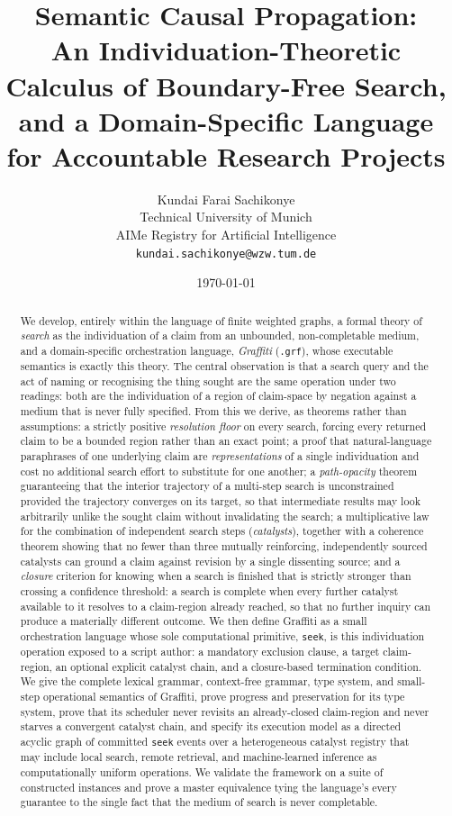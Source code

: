 \documentclass[11pt,twocolumn,a4paper]{article}
\title{\textbf{Semantic Causal Propagation:\\[3pt]
An Individuation-Theoretic Calculus of Boundary-Free Search,\\
and a Domain-Specific Language for Accountable Research Projects}}
\author{%
Kundai Farai Sachikonye\\
\small Technical University of Munich\\
\small AIMe Registry for Artificial Intelligence\\
\small \texttt{kundai.sachikonye@wzw.tum.de}}
\date{\today}
\theoremstyle{thmstyle}
\theoremstyle{definition}
\theoremstyle{remark}
\begin{document}
\maketitle

\begin{abstract}
\noindent
We develop, entirely within the language of finite weighted graphs, a
formal theory of \emph{search} as the individuation of a claim from an
unbounded, non-completable medium, and a domain-specific orchestration
language, \emph{Graffiti} (\texttt{.grf}), whose executable semantics is
exactly this theory. The central observation is that a search query and
the act of naming or recognising the thing sought are the same operation
under two readings: both are the individuation of a region of claim-space
by negation against a medium that is never fully specified. From this we
derive, as theorems rather than assumptions: a strictly positive
\emph{resolution floor} on every search, forcing every returned claim to
be a bounded region rather than an exact point; a proof that natural-language
paraphrases of one underlying claim are \emph{representations} of a single
individuation and cost no additional search effort to substitute for one
another; a \emph{path-opacity} theorem guaranteeing that the interior
trajectory of a multi-step search is unconstrained provided the trajectory
converges on its target, so that intermediate results may look arbitrarily
unlike the sought claim without invalidating the search; a multiplicative
law for the combination of independent search steps (\emph{catalysts}),
together with a coherence theorem showing that no fewer than three mutually
reinforcing, independently sourced catalysts can ground a claim against
revision by a single dissenting source; and a \emph{closure} criterion for
knowing when a search is finished that is strictly stronger than crossing a
confidence threshold: a search is complete when every further catalyst
available to it resolves to a claim-region already reached, so that no
further inquiry can produce a materially different outcome. We then define
Graffiti as a small orchestration language whose sole computational
primitive, \texttt{seek}, is this individuation operation exposed to a
script author: a mandatory exclusion clause, a target claim-region, an
optional explicit catalyst chain, and a closure-based termination
condition. We give the complete lexical grammar, context-free grammar,
type system, and small-step operational semantics of Graffiti, prove
progress and preservation for its type system, prove that its scheduler
never revisits an already-closed claim-region and never starves a
convergent catalyst chain, and specify its execution model as a directed
acyclic graph of committed \texttt{seek} events over a heterogeneous
catalyst registry that may include local search, remote retrieval, and
machine-learned inference as computationally uniform operations. We
validate the framework on a suite of constructed instances and prove a
master equivalence tying the language's every guarantee to the single
fact that the medium of search is never completable.
\end{abstract}
\end{document}
